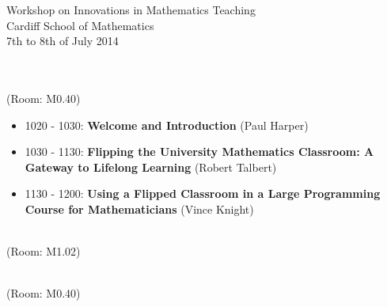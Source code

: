 \documentclass[a4paper]{article}
\begin{document}



\begin{center}
    {\Huge Workshop on Innovations in Mathematics Teaching}\\
    {\tiny Cardiff School of Mathematics}\\
    {\tiny 7th to 8th of July 2014}\\
    \vspace{1cm}
    {}\\
\end{center}

\vspace{1cm}

\begin{center}
    \\
    \tiny{(Room: M0.40)}
\end{center}

\begin{itemize}
    \item 1020 - 1030: \textbf{Welcome and Introduction} (Paul Harper)
    \item 1030 - 1130: \textbf{Flipping the University Mathematics Classroom: A Gateway to Lifelong Learning} (Robert Talbert)
    \item 1130 - 1200: \textbf{Using a Flipped Classroom in a Large Programming Course for Mathematicians} (Vince Knight)
\end{itemize}

\vspace{1cm}

\begin{center}
    \\
    \tiny{(Room: M1.02)}
\end{center}

\vspace{1cm}

\begin{center}
    \\
    \tiny{(Room: M0.40)}
\end{center}
\end{document}
